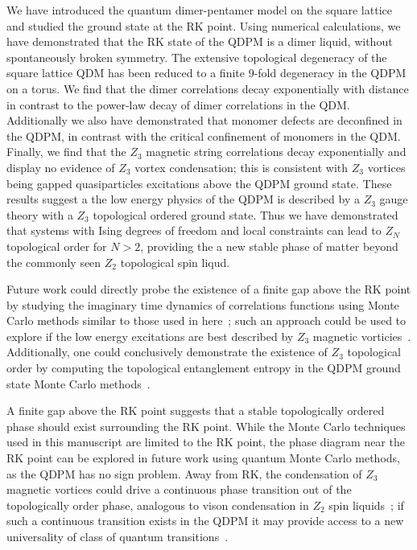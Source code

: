 \documentclass[twocolumn,prb,aps,floatfix,superscriptaddress]{revtex4-1}
\begin{document}
We have introduced the quantum dimer-pentamer model on the square lattice and studied the ground state at the RK point. Using numerical calculations, we have demonstrated that the RK state of the QDPM is a dimer liquid, without spontaneously broken symmetry. The extensive topological degeneracy of the square lattice QDM has been reduced to a finite 9-fold degeneracy in the QDPM on a torus. We find that the dimer correlations decay exponentially with distance in contrast to the power-law decay of dimer correlations in the QDM. Additionally we also have demonstrated that monomer defects are deconfined in the QDPM, in contrast with the critical confinement of monomers in the QDM. Finally, we find that the $Z_3$ magnetic string correlations decay exponentially and display no evidence of $Z_3$ vortex condensation; this is consistent with $Z_3$ vortices being gapped quasiparticles excitations above the QDPM ground state. These results suggest a the low energy physics of the QDPM is described by a $Z_3$ gauge theory with a $Z_3$ topological ordered ground state. Thus we have demonstrated that systems with Ising degrees of freedom and local constraints can lead to $Z_N$ topological order for $N>2$, providing the a new stable phase of matter beyond the commonly seen $Z_2$ topological spin liqud.

Future work could directly probe the existence of a finite gap above the RK point by studying the imaginary time dynamics of correlations functions using Monte Carlo methods similar to those used in here~\cite{Henley1997,Henley2004a}; such an approach could be used to explore if the low energy excitations are best described by $Z_3$ magnetic vorticies~\cite{Ivanov2004,Ralko2007,Misguich2008d}. Additionally, one could conclusively demonstrate the existence of $Z_3$ topological order by computing the topological entanglement entropy in the QDPM ground state Monte Carlo methods~\cite{Levin2005a,Kitaev2006b,Hastings2010}. 

A finite gap above the RK point suggests that a stable topologically ordered phase should exist surrounding the RK point. While the Monte Carlo techniques used in this manuscript are limited to the RK point, the phase diagram near the RK point can be explored in future work using quantum Monte Carlo methods, as the QDPM has no sign problem. Away from RK, the condensation of $Z_3$ magnetic vortices could drive a continuous phase transition out of the topologically order phase, analogous to vison condensation in $Z_2$ spin liquids~\cite{Jalabert1991,Ralko2007,Huh2011,Hao2014,Slagle2014}; if such a continuous transition exists in the QDPM it may provide access to a new universality of class of quantum transitions~\cite{XU2012}.
\end{document}
